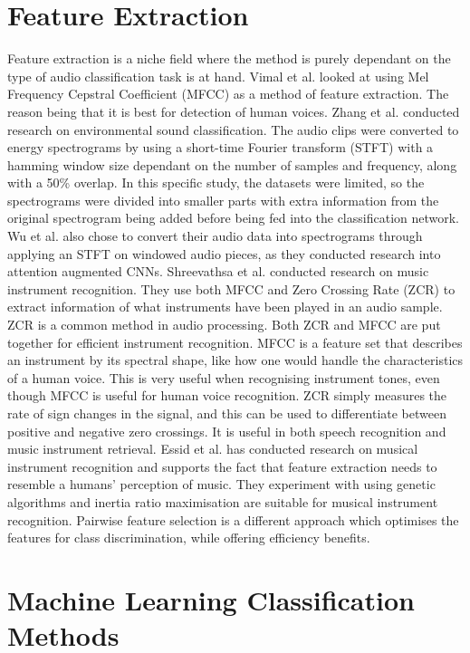 \section{Feature Extraction}

Feature extraction is a niche field where the method is purely dependant on the type of audio classification task is at hand. Vimal et al. looked at using Mel Frequency Cepstral Coefficient (MFCC) as a method of feature extraction. The reason being that it is best for detection of human voices. Zhang et al. conducted research on environmental sound classification. The audio clips were converted to energy spectrograms by using a short-time Fourier transform (STFT) with a hamming window size dependant on the number of samples and frequency, along with a 50\% overlap. In this specific study, the datasets were limited, so the spectrograms were divided into smaller parts with extra information from the original spectrogram being added before being fed into the classification network. Wu et al. also chose to convert their audio data into spectrograms through applying an STFT on windowed audio pieces, as they conducted research into attention augmented CNNs. 
Shreevathsa et al. conducted research on music instrument recognition. They use both MFCC and Zero Crossing Rate (ZCR) to extract information of what instruments have been played in an audio sample. ZCR is a common method in audio processing. Both ZCR and MFCC are put together for efficient instrument recognition. MFCC is a feature set that describes an instrument by its spectral shape, like how one would handle the characteristics of a human voice. This is very useful when recognising instrument tones, even though MFCC is useful for human voice recognition. ZCR simply measures the rate of sign changes in the signal, and this can be used to differentiate between positive and negative zero crossings. It is useful in both speech recognition and music instrument retrieval. Essid et al. has conducted research on musical instrument recognition and supports the fact that feature extraction needs to resemble a humans’ perception of music. They experiment with using genetic algorithms and inertia ratio maximisation are suitable for musical instrument recognition. Pairwise feature selection is a different approach which optimises the features for class discrimination, while offering efficiency benefits. 

\section{Machine Learning Classification Methods}

